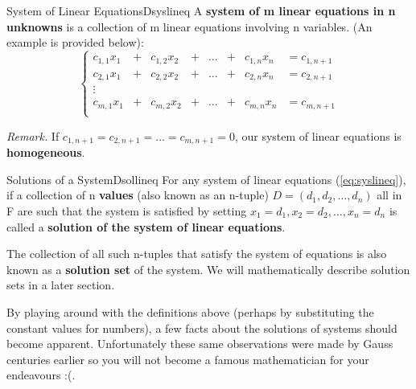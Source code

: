 \documentclass[oneside]{book}
\begin{document}
	\begin{defn}{System of Linear Equations}{Dsyslineq}
		A \textbf{system of m linear equations in n unknowns} is a collection of m linear equations involving n variables. (An example is provided below):
	\begin{equation}
		\label{eq:syslineq}
		\left\{
		\begin{alignedat}{4} 
			c_{1,1}x_1 & +{} &  c_{1,2}x_2 & +{} & \ldots & +{} & c_{1,n}x_n & = c_{1,n+1} \\
			c_{2,1}x_1 & +{} &  c_{2,2}x_2 & +{} & \ldots & +{} & c_{2,n}x_n & = c_{2,n+1} \\
			\vdots \\
			c_{m,1}x_1 & +{} &  c_{m,2}x_2 & +{} & \ldots & +{} & c_{m,n}x_n & = c_{m,n+1} \\
		\end{alignedat}
		\right.
	\end{equation}
	\end{defn}
	\textit{Remark.} If $c_{1,n+1}=c_{2,n+1}=\ldots=c_{m,n+1}=0$, our system of linear equations is \textbf{homogeneous}.

	\begin{defn}{Solutions of a System}{Dsollineq}
		For any system of linear equations (\ref{eq:syslineq}), if a collection of n \textbf{values} (also known as an n-tuple) $D=(d_1,d_2,\ldots,d_n)$ all in F are such that the system is satisfied by setting $x_1=d_1, x_2=d_2, \ldots, x_n=d_n$ is called a \textbf{solution of the system of linear equations}.
		
		The collection of all such n-tuples that satisfy the system of equations is also known as a \textbf{solution set} of the system. We will mathematically describe solution sets in a later section.
	\end{defn}
	
	By playing around with the definitions above (perhaps by substituting the constant values for numbers), a few facts about the solutions of systems should become apparent. Unfortunately these same observations were made by Gauss centuries earlier so you will not become a famous mathematician for your endeavours :(.
	
\end{document}
